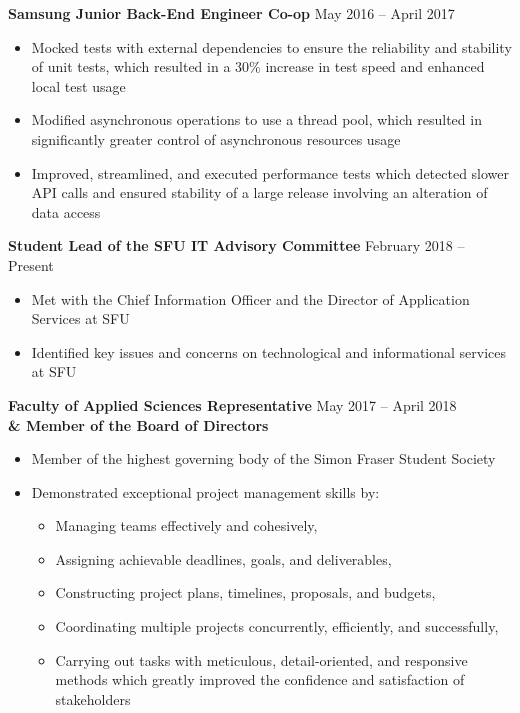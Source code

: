 	\begin{large}
		\textbf{Samsung Junior Back-End Engineer Co-op} \hfill May 2016 -- April 2017
	\end{large}
	\begin{itemize}
		\item Mocked tests with external dependencies to ensure the reliability and stability of unit tests, which resulted in a 30\% increase in test speed and enhanced local test usage
		\item Modified asynchronous operations to use a thread pool, which resulted in significantly greater control of asynchronous resources usage
		\item Improved, streamlined, and executed performance tests which detected slower API calls and ensured stability of a large release involving an alteration of data access
	\end{itemize}

	\hspace{1cm}

	\noindent
	\begin{large}
		\textbf{Student Lead of the SFU IT Advisory Committee} \hfill February 2018 -- Present
	\end{large}
	\begin{itemize}
		\item Met with the Chief Information Officer and the Director of Application Services at SFU
		\item Identified key issues and concerns on technological and informational services at SFU
	\end{itemize}

	\hspace{1cm}

	\noindent
	\begin{large}
		\textbf{Faculty of Applied Sciences Representative} \hfill May 2017 -- April 2018 \\
			\textbf{\& Member of the Board of Directors}
	\end{large}
	\begin{itemize}
		\item Member of the highest governing body of the Simon Fraser Student Society
		\item Demonstrated exceptional project management skills by:
		\begin{itemize}
			\item Managing teams effectively and cohesively,
			\item Assigning achievable deadlines, goals, and deliverables,
			\item Constructing project plans, timelines, proposals, and budgets,
			\item Coordinating multiple projects concurrently, efficiently, and successfully,
			\item Carrying out tasks with meticulous, detail-oriented, and responsive methods which greatly improved the confidence and satisfaction of stakeholders
		\end{itemize}
	\end{itemize}

